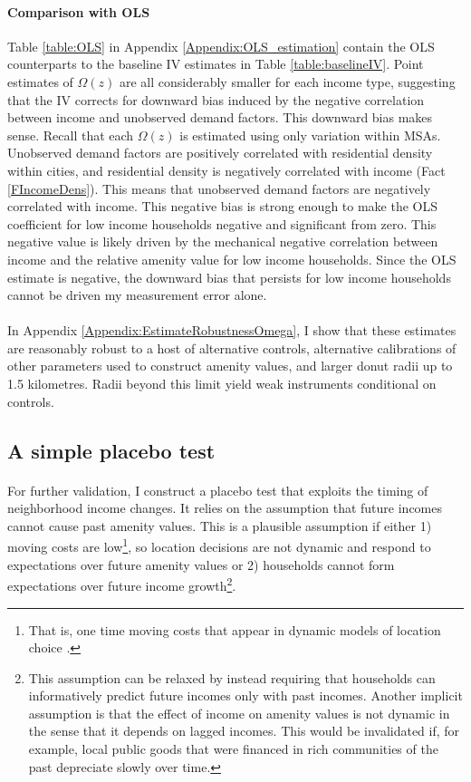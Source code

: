 \documentclass[12pt]{article}
\begin{document}
\paragraph*{Comparison with OLS} Table \ref{table:OLS} in Appendix \ref{Appendix:OLS_estimation} contain the OLS counterparts to the baseline IV estimates in Table \ref{table:baselineIV}. Point estimates of $\Omega(z)$ are all considerably smaller for each income type, suggesting that the IV corrects for downward bias induced by the negative correlation between income and unobserved demand factors. This downward bias makes sense. Recall that each $\Omega(z)$ is estimated using only variation within MSAs. Unobserved demand factors are positively correlated with residential density within cities, and residential density is negatively correlated with income (Fact \ref{FIncomeDens}). This means that unobserved demand factors are negatively correlated with income. This negative bias is strong enough to make the OLS coefficient for low income households negative and significant from zero. This negative value is likely driven by the mechanical negative correlation between income and the relative amenity value for low income households. Since the OLS estimate is negative, the downward bias that persists for low income households cannot be driven my measurement error alone.

\paragraph*{}
In Appendix \ref{Appendix:EstimateRobustnessOmega}, I show that these estimates are reasonably robust to a host of alternative controls, alternative calibrations of other parameters used to construct amenity values, and larger donut radii up to 1.5 kilometres. Radii beyond this limit yield weak instruments conditional on controls. 

\subsection{A simple placebo test} 
\paragraph*{}
For further validation, I construct a placebo test that exploits the timing of neighborhood income changes. It relies on the assumption that future incomes cannot cause past amenity values. This is a plausible assumption if either 1) moving costs are low\footnote{That is, one time moving costs that appear in dynamic models of location choice \citep{CaliendoDvorkinParro, BMMT}.}, so location decisions are not dynamic and respond to expectations over future amenity values or 2) households cannot form expectations over future income growth\footnote{This assumption can be relaxed by instead requiring that households can informatively predict future incomes only with past incomes. Another implicit assumption is that the effect of income on amenity values is not dynamic in the sense that it depends on lagged incomes. This would be invalidated if, for example, local public goods that were financed in rich communities of the past depreciate slowly over time.}. 
\end{document}
